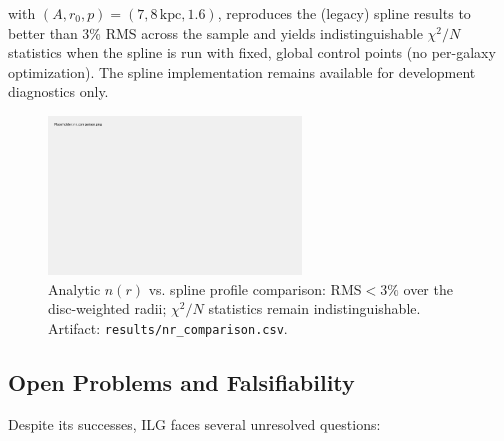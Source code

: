 \documentclass[12pt,a4paper]{article}
\begin{document}
with $(A, r_0, p) = (7, 8\,\text{kpc}, 1.6)$, reproduces the (legacy) spline results to better than 3\% RMS across the sample and yields indistinguishable $\chi^2/N$ statistics when the spline is run with fixed, global control points (no per-galaxy optimization). The spline implementation remains available for development diagnostics only.

\begin{figure}[h]
\centering
\includegraphics[width=0.6\textwidth]{results/nr_comparison.png}
\caption{Analytic $n(r)$ vs. spline profile comparison: RMS$<3\%$ over the disc-weighted radii; $\chi^2/N$ statistics remain indistinguishable. Artifact: \texttt{results/nr\_comparison.csv}.}
\label{fig:nr-comparison}
\end{figure}

\subsection{Open Problems and Falsifiability}

Despite its successes, ILG faces several unresolved questions:
\end{document}

